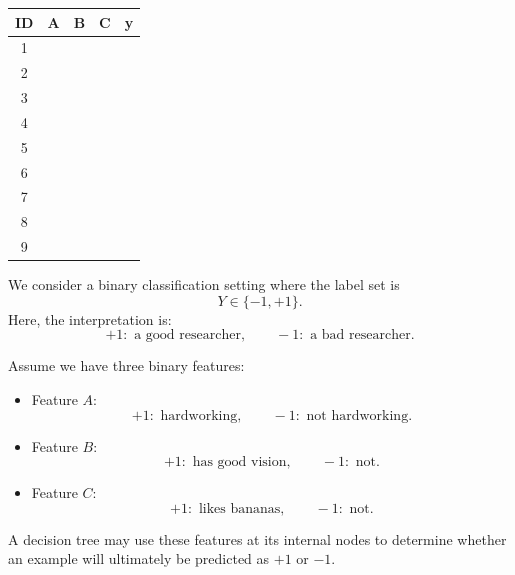 \documentclass[../main]{subfiles}
\begin{document}
    \begin{example}
        \newcommand{\cmark}{\ding{51}} %
\newcommand{\xmark}{\ding{55}} %

\begin{table}
    \centering
    \vspace{2mm}
    \begin{tabular}{c|ccc|c}
        \textbf{ID} & \textbf{A} & \textbf{B} & \textbf{C} & \textbf{y} \\ \hline
        1 & \cmark & \cmark & \cmark & \cmark \\
        2 & \cmark & \xmark & \xmark & \cmark \\
        3 & \cmark & \xmark & \cmark & \xmark \\
        4 & \xmark & \cmark & \cmark & \xmark \\
        5 & \xmark & \xmark & \xmark & \xmark \\
        6 & \xmark & \xmark & \xmark & \xmark \\
        7 & \xmark & \cmark & \xmark & \xmark \\
        8 & \cmark & \xmark & \cmark & \xmark \\
        9 & \xmark & \cmark & \cmark & \xmark \\
    \end{tabular}
\end{table}

    We consider a binary classification setting where the label set is
    \begin{equation}
        Y \in \{-1, +1\}.
    \end{equation}
    Here, the interpretation is:
    \begin{equation}
        +1: \text{ a good researcher}, \qquad
        -1: \text{ a bad researcher}.
    \end{equation}
    
    Assume we have three binary features:
    
    \begin{itemize}
        \item Feature \(A\):
        \begin{equation}
            +1: \text{ hardworking}, \qquad -1: \text{ not hardworking}.
        \end{equation}
    
        \item Feature \(B\):
        \begin{equation}
            +1: \text{ has good vision}, \qquad -1: \text{ not}.
        \end{equation}
    
        \item Feature \(C\):
        \begin{equation}
            +1: \text{ likes bananas}, \qquad -1: \text{ not}.
        \end{equation}
    \end{itemize}
    
    A decision tree may use these features at its internal nodes to determine
    whether an example will ultimately be predicted as \(+1\) or \(-1\).
    \end{example}
\end{document}
